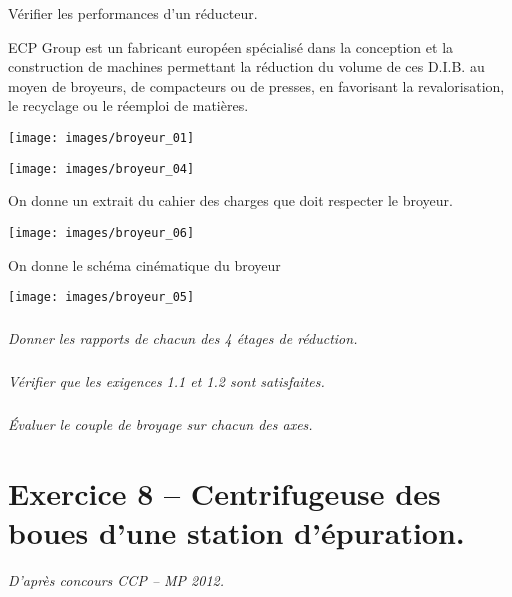 \documentclass[10pt,fleqn]{article} %
\begin{document}
\begin{multicols}{2}
\begin{multicols}{2}
\begin{obj}
Vérifier les performances d'un réducteur.
\end{obj}

\ifprof
\else

ECP Group est un fabricant européen spécialisé
dans la conception et la construction de machines
permettant la réduction du volume de ces D.I.B. au
moyen de broyeurs, de compacteurs ou de presses,
en favorisant la revalorisation, le recyclage ou le réemploi
de matières.

\begin{center}
\texttt{[image: images/broyeur\_01]}
\end{center}

\begin{center}
\texttt{[image: images/broyeur\_04]}
\end{center}

On donne un extrait du cahier des charges que doit respecter le broyeur.
\fi

\ifprof
\else
\begin{center}
\texttt{[image: images/broyeur\_06]}
\end{center}

On donne le schéma cinématique du broyeur
\begin{center}
\texttt{[image: images/broyeur\_05]}
\end{center}

\fi

\subparagraph{}\textit{Donner les rapports de chacun des 4 étages de réduction.}
\ifprof
\begin{corrige}
\end{corrige}
\else
\fi

\subparagraph{}\textit{Vérifier que les exigences 1.1 et 1.2 sont satisfaites.}
\ifprof
\begin{corrige}
\end{corrige}
\else
\fi

\subparagraph{}\textit{Évaluer le couple de broyage sur chacun des axes.}
\ifprof
\begin{corrige}
\end{corrige}
\else
\fi



\section*{Exercice 8 -- Centrifugeuse des boues d'une station d'épuration.}
\setcounter{exo}{0}
\textit{D'après concours CCP -- MP 2012.}


\end{multicols}
\end{multicols}
\end{document}
